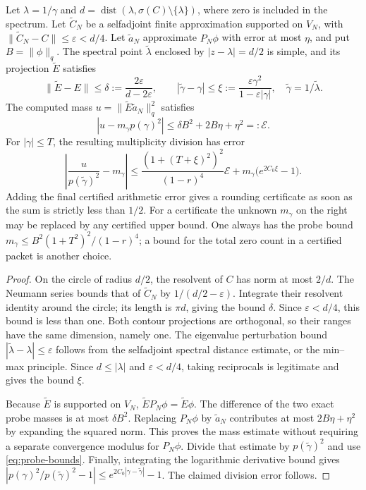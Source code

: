 \begin{proposition}
\label{prop:spectral-rounding}
Let $\lambda=1/\gamma$ and
$d=\operatorname{dist}(\lambda,\sigma(C)\setminus\{\lambda\})$,
where zero is included in the spectrum. Let $\widetilde C_N$ be a
selfadjoint finite approximation supported on $V_N$, with
$\|\widetilde C_N-C\|\le\varepsilon<d/4$. Let
$\widetilde a_N$ approximate $P_N\phi$ with error at most $\eta$,
and put $B=\|\phi\|_q$.
The spectral point $\widetilde\lambda$ enclosed by
$|z-\lambda|=d/2$ is simple, and its projection $\widetilde E$ satisfies
\[
 \|\widetilde E-E\|\le
 \delta:=\frac{2\varepsilon}{d-2\varepsilon},\qquad
 |\widetilde\gamma-\gamma|\le
 \xi:=\frac{\varepsilon\gamma^2}{1-\varepsilon|\gamma|},
 \quad\widetilde\gamma=1/\widetilde\lambda.
\]
The computed mass $u=\|\widetilde E\widetilde a_N\|_q^2$ satisfies
\[
 |u-m_\gamma p(\gamma)^2|
       \le\delta B^2+2B\eta+\eta^2=:\mathcal E.
\]
For $|\gamma|\le T$, the resulting multiplicity division has error
\begin{equation}
 \left|\frac{u}{p(\widetilde\gamma)^2}-m_\gamma\right|
 \le
 \frac{(1+(T+\xi)^2)^2}{(1-r)^4}\mathcal E
       +m_\gamma\bigl(e^{2C_0\xi}-1\bigr).
 \label{eq:spectral-rounding-error}
\end{equation}
Adding the final certified arithmetic error gives a rounding certificate
as soon as the sum is strictly less than $1/2$.
For a certificate the unknown $m_\gamma$ on the right may be replaced
by any certified upper bound. One always has the probe bound
$m_\gamma\le B^2(1+T^2)^2/(1-r)^4$; a bound for the total zero count
in a certified packet is another choice.
\end{proposition}

\begin{proof}
On the circle of radius $d/2$, the resolvent of $C$ has norm at most
$2/d$. The Neumann series bounds that of $\widetilde C_N$ by
$1/(d/2-\varepsilon)$. Integrate their resolvent identity around the
circle; its length is $\pi d$, giving the bound $\delta$.
Since $\varepsilon<d/4$, this bound is less than one. Both contour
projections are orthogonal, so their ranges have the same dimension,
namely one. The eigenvalue perturbation bound
$|\widetilde\lambda-\lambda|\le\varepsilon$ follows from the
selfadjoint spectral distance estimate, or the min--max principle.
Since $d\le|\lambda|$ and $\varepsilon<d/4$, taking reciprocals is
legitimate and gives the bound $\xi$.

Because $\widetilde E$ is supported on $V_N$,
$\widetilde EP_N\phi=\widetilde E\phi$. The difference of the two
exact probe masses is at most $\delta B^2$. Replacing $P_N\phi$ by
$\widetilde a_N$ contributes at most $2B\eta+\eta^2$ by expanding
the squared norm. This proves the mass estimate without requiring a
separate convergence modulus for $P_N\phi$.
Divide that estimate by $p(\widetilde\gamma)^2$ and use
\eqref{eq:probe-bounds}. Finally, integrating the logarithmic derivative
bound gives
$|p(\gamma)^2/p(\widetilde\gamma)^2-1|
\le e^{2C_0|\gamma-\widetilde\gamma|}-1$.
The claimed division error follows.
\end{proof}

